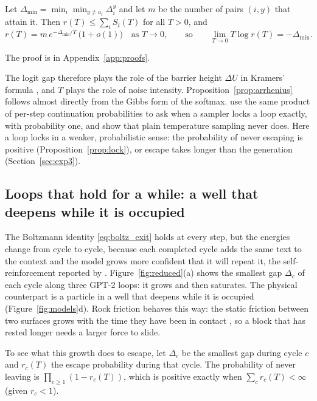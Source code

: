 \begin{proposition}
\label{prop:arrhenius}
Let $\Delta_{\min}=\min_i\min_{y\neq a_i}\Delta_i^{y}$ and let $m$ be the number of pairs $(i,y)$ that attain it. Then $r(T)\le \sum_{i}S_i(T)$ for all $T>0$, and
\begin{equation}
r(T)= m\, e^{-\Delta_{\min}/T}\,\big(1+o(1)\big)\quad\text{as } T\to0,\qquad\text{so}\qquad \lim_{T\to0}T\log r(T)=-\Delta_{\min}.
\end{equation}
\end{proposition}
\noindent The proof is in Appendix~\ref{app:proofs}.

The logit gap therefore plays the role of the barrier height $\Delta U$ in Kramers' formula \citep{kramers1940brownian}, and $T$ plays the role of noise intensity. Proposition~\ref{prop:arrhenius} follows almost directly from the Gibbs form of the softmax. \citet{chen2026repetition} use the same product of per-step continuation probabilities to ask when a sampler locks a loop exactly, with probability one, and show that plain temperature sampling never does. Here a loop locks in a weaker, probabilistic sense: the probability of never escaping is positive (Proposition~\ref{prop:lock}), or escape takes longer than the generation (Section~\ref{sec:exp3}).

\subsection{Loops that hold for a while: a well that deepens while it is occupied}
\label{sec:deepening}

The Boltzmann identity \eqref{eq:boltz_exit} holds at every step, but the energies change from cycle to cycle, because each completed cycle adds the same text to the context and the model grows more confident that it will repeat it, the self-reinforcement reported by \citet{xu2022learning}. Figure~\ref{fig:reduced}(a) shows the smallest gap $\Delta_c$ of each cycle along three GPT-2 loops: it grows and then saturates. The physical counterpart is a particle in a well that deepens while it is occupied (Figure~\ref{fig:models}d). Rock friction behaves this way: the static friction between two surfaces grows with the time they have been in contact \citep{dieterich1972time}, so a block that has rested longer needs a larger force to slide.

To see what this growth does to escape, let $\Delta_c$ be the smallest gap during cycle $c$ and $r_c(T)$ the escape probability during that cycle. The probability of never leaving is $\prod_{c\ge1}(1-r_c(T))$, which is positive exactly when $\sum_c r_c(T)<\infty$ (given $r_c<1$).

